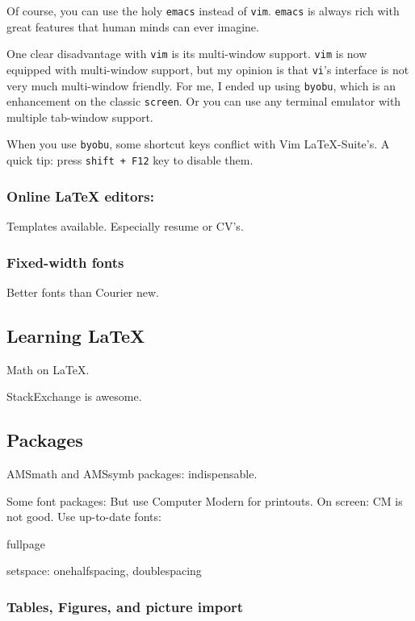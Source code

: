 \documentclass[11pt]{article}
\begin{document}
Of course, you can use the holy \texttt{emacs} instead of \texttt{vim}.
\texttt{emacs} is always rich with great features that human minds can
ever imagine. 

One clear disadvantage with \texttt{vim} is its multi-window support.
\texttt{vim} is now equipped with multi-window support, but my opinion is that
\texttt{vi}'s interface is not very much multi-window friendly. For me, I
ended up using \texttt{byobu}, which is an enhancement on the classic
\texttt{screen}. Or you can use any terminal emulator with multiple tab-window
support.

When you use \texttt{byobu}, some shortcut keys conflict with Vim
LaTeX-Suite's. A quick tip: press \texttt{shift + F12} key to disable them.

\subsubsection{Online LaTeX editors:}

Templates available. Especially resume or CV's.

\subsubsection{Fixed-width fonts}

Better fonts than Courier new.

\subsection{Learning LaTeX}

Math on LaTeX.

StackExchange is awesome.

\subsection{Packages}

AMSmath and AMSsymb packages: indispensable.

Some font packages: But use Computer Modern for printouts. On screen: CM is
not good. Use up-to-date fonts: 

fullpage

setspace: onehalfspacing, doublespacing

\subsubsection{Tables, Figures, and picture import}
\end{document}
